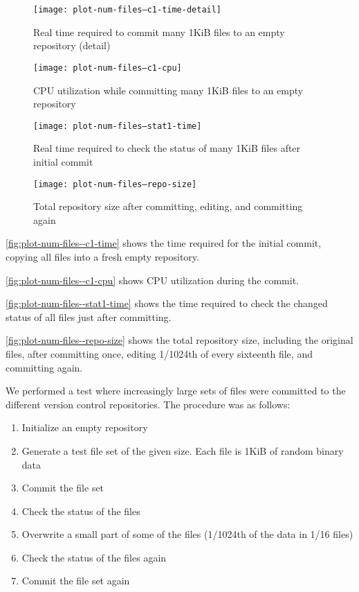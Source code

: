 \begin{figure}[p]
  \caption{Real time required to commit many 1KiB files to an empty repository
  (detail)}
  \label{fig:plot-num-files--c1-time-detail}
  \centering
    \texttt{[image: plot-num-files--c1-time-detail]}
\end{figure}

\begin{figure}[p]
  \caption{CPU utilization while committing many 1KiB files to an empty
  repository}
  \label{fig:plot-num-files--c1-cpu}
  \centering
    \texttt{[image: plot-num-files--c1-cpu]}
\end{figure}

\begin{figure}[p]
  \caption{Real time required to check the status of many 1KiB files after
  initial commit}
  \label{fig:plot-num-files--stat1-time}
  \centering
    \texttt{[image: plot-num-files--stat1-time]}
\end{figure}

\begin{figure}[p]
  \caption{Total repository size after committing, editing, and committing again}
  \label{fig:plot-num-files--repo-size}
  \centering
    \texttt{[image: plot-num-files--repo-size]}
\end{figure}

\autoref{fig:plot-num-files--c1-time} shows the time
required for the initial commit, copying all files into a fresh empty
repository.

\autoref{fig:plot-num-files--c1-cpu} shows CPU utilization
during the commit.

\autoref{fig:plot-num-files--stat1-time} shows the time
required to check the changed status of all files just after committing.

\autoref{fig:plot-num-files--repo-size} shows the total
repository size, including the original files, after committing once, editing
1/1024th of every sixteenth file, and committing again.


\iffalse

We performed a test where increasingly large sets of files were committed to the
different version control repositories. The procedure was as follows:

\begin{enumerate}
    \setlength{\itemsep}{0pt}
    \setlength{\parskip}{0pt}
    \setlength{\parsep}{0pt}
    \item Initialize an empty repository
    \item Generate a test file set of the given size. Each file is 1KiB of
        random binary data
    \item Commit the file set
    \item Check the status of the files
    \item Overwrite a small part of some of the files (1/1024th of the data in
        1/16 files)
    \item Check the status of the files again
    \item Commit the file set again
\end{enumerate}

